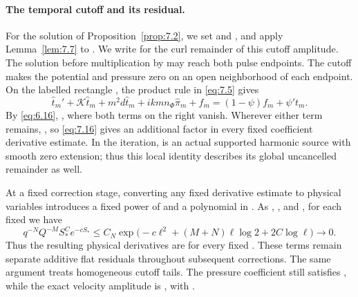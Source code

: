 \paragraph{The temporal cutoff and its residual.}
For the solution of Proposition~\ref{prop:7.2}, we set
and , and apply Lemma~\ref{lem:7.7} to
. We write  for the curl remainder of this cutoff
amplitude. The solution before multiplication by  may reach both pulse endpoints. The
%
cutoff makes the potential and pressure zero on an open neighborhood of each endpoint.
On the labelled rectangle , the product rule in \eqref{eq:7.5} gives
\begin{equation}
  \widehat t_m'+\mathcal K\widehat t_m+m^2d\widehat t_m
  +ikm n_\Phi\widehat\pi_m+f_m
  =(1-\psi)f_m+\psi't_m.
\tag{7.40}\label{eq:7.40}
\end{equation}
By \eqref{eq:6.16}, , where both terms on the right vanish. Wherever
either term remains, , so \eqref{eq:7.16} gives an additional factor
 in every
fixed coefficient derivative estimate. In the iteration,  is an actual supported harmonic
source with smooth zero extension; thus this local identity describes its global uncancelled
remainder as well.

At a fixed correction stage, converting any fixed derivative estimate to physical variables
introduces a fixed power of  and a polynomial in
. As ,
, and ,
for each fixed  we have
\[
  q^{-N}Q^{-M}S_*^C e^{-cS_*}
  \leq C_N\exp\bigl(-c\ell^2+(M+N)\ell\log 2+2C\log\ell\bigr)
  \longrightarrow 0.
\]
Thus the resulting physical derivatives are  for every fixed
. These terms remain
separate additive flat residuals throughout subsequent corrections. The same argument
treats homogeneous cutoff tails. The pressure coefficient still satisfies
, while
the exact velocity amplitude is
, with
.

